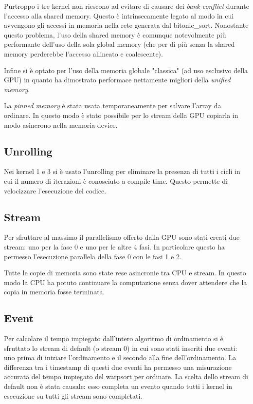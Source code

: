 \documentclass[a4paper, 11pt]{article}
\begin{document}
			Purtroppo i tre kernel non riescono ad evitare di causare dei \emph{bank conflict} durante l'accesso alla shared memory. 
			Questo è intrinsecamente legato al modo in cui avvengono gli accessi in memoria nella rete generata dal bitonic\_sort.
			Nonostante questo problema, l'uso della shared memory è comunque notevolmente più performante dell'uso della sola global memory 
			(che per di più senza la shared memory perderebbe l'accesso allineato e coalescente).  
		
			Infine si è optato per l'uso della memoria globale "classica" (ad uso esclusivo della GPU) in quanto ha dimostrato performace
			nettamente migliori della \emph{unified memory}.
			
			La \emph{pinned memory} è stata usata temporaneamente per salvare l'array da ordinare. 
			In questo modo è stato possibile per lo stream della GPU copiarla in modo asincrono nella memoria device.
		\subsection{Unrolling}
			Nei kernel 1 e 3 si è usato l'unrolling per eliminare la presenza di tutti i cicli in cui il numero di iterazioni è conosciuto a
			compile-time. 
			Questo permette di velocizzare l'esecuzione del codice. 
			
		\subsection{Stream}
			Per sfruttare al massimo il parallelismo offerto dalla GPU sono stati creati due stream: 
			uno per la fase 0 e uno per le altre 4 fasi.			
			In particolare questo ha permesso l'esecuzione parallela della fase 0 con le fasi 1 e 2.
			
			Tutte le copie di memoria sono state rese asincronie tra CPU e stream. In questo modo la CPU ha potuto continuare la 
			computazione senza dover attendere che la copia in memoria fosse terminata.			
			
		\subsection{Event}
			Per calcolare il tempo impiegato dall'intero algoritmo di ordinamento si è sfruttato lo stream di default (o stream 0)
			in cui sono stati inseriti due eventi: uno prima di iniziare l'ordinamento e il secondo alla fine dell'ordinamento.
			La differenza tra i timestamp di questi due eventi ha permesso una misurazione accurata del tempo impiegato del warpsort per ordinare.
			La scelta dello stream di default non è stata causale: esso
			completa un evento quando tutti i kernel in esecuzione su 
			tutti gli stream sono completati.
\end{document}
